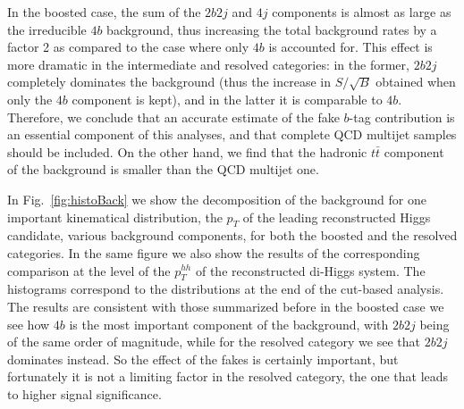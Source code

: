 In the boosted case, the sum of the $2b2j$ and $4j$ components is almost as large as the
irreducible $4b$ background, thus increasing the total background rates by a factor 2 as compared
to the case where only $4b$ is accounted for.
%
This effect is more dramatic in the intermediate and resolved categories: in the former,
$2b2j$ completely dominates the background (thus the increase in $S/\sqrt{B}$
obtained when only the $4b$ component is kept), and in the latter
it is comparable to $4b$.
%
Therefore, we conclude that an accurate estimate of the fake $b$-tag contribution is
an essential component of this analyses, and that complete QCD multijet samples
should be included.
%
On the other hand, we find that the hadronic $t\bar{t}$ component of the background
is smaller than the QCD multijet one.

In Fig.~\ref{fig:histoBack} we show the decomposition of the background for one important kinematical
distribution, the $p_T$ of the leading reconstructed Higgs candidate, various background
components, for both the boosted and the resolved categories.
%
In the same figure we also show the results of the corresponding comparison
at the level of the $p_T^{hh}$ of the
reconstructed di-Higgs system.
%
The histograms correspond to the distributions at the end of the cut-based
analysis.
%
The results are consistent with those summarized
before in the boosted case we see how $4b$ is the most important
component of the background, with $2b2j$ being of the same order of magnitude, while
for the resolved category we see that $2b2j$ dominates instead.
%
So the effect of the fakes is certainly important, but fortunately it is not a limiting factor
in the resolved category, the one that leads to higher signal significance.

